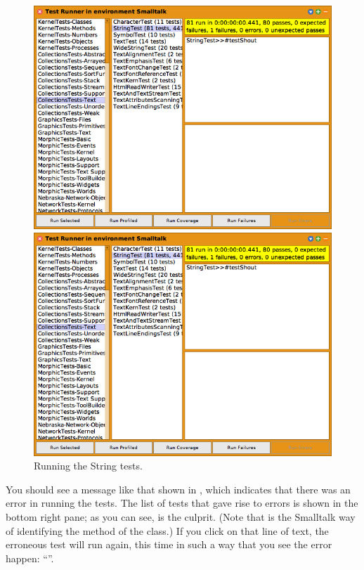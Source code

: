 \documentclass[a4paper,10pt,twoside]{book}
\begin{document}
\begin{figure}[hbt]
\ifluluelse
	{\centerline {\includegraphics[width=\textwidth]{testRunnerOnStringTest}}}
	{\centerline {\includegraphics[scale=0.5]{testRunnerOnStringTest}}}
\caption{Running the String tests.
\label{fig:testRunnerTestShout}}
\end{figure}

You should see a message like that shown in , which indicates that there was an error in running the tests.  The list of tests that gave rise to errors is shown in the bottom right pane; as you can see,  is the culprit.
(Note that  is the Smalltalk way of identifying the  method of the  class.)
If you click on that line of text, the erroneous test will run again, this time in such a way that you see the error happen: ``''.
\end{document}
